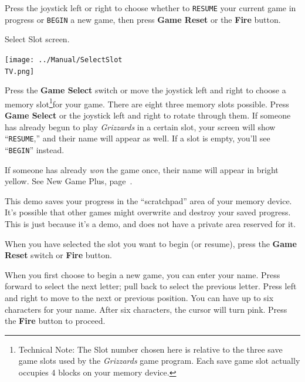 \documentclass[10pt,twocolumn,openany,article]{memoir}
\newcommand\TV{NTSC}
\newcommand\TV{PAL}
\newcommand\TV{SECAM}
\begin{document}
Press the  joystick left or  right to choose whether  to \texttt{RESUME}
your current game  in progress or \texttt{BEGIN} a new  game, then press
\textbf{Game Reset} or the \textbf{Fire} button.

\else
Select Slot screen.

\begin{center}
  \texttt{[image: ../Manual/SelectSlot\\TV.png]}
\end{center}

Press  the \textbf{Game  Select} switch  or move  the joystick  left and
right             to             choose             a             memory
slot\ifdefined\ATARIAGESAVE\else\footnote{Technical   Note:   The   Slot
  number chosen  here is relative to  the three save game  slots used by
  the  \textit{Grizzards} game  program.  Each save  game slot  actually
  occupies 4 blocks on your memory  device.}\fi for your game. There are
\ifdefined\ATARIAGESAVE  eight \else  three \fi  memory slots  possible.
Press  \textbf{Game Select}  or the  joystick left  and right  to rotate
through them. If someone has already begun to play \textit{Grizzards} in
a certain  slot, your  screen will  show ``\texttt{RESUME},''  and their
name  will   appear  as   well.  If   a  slot   is  empty,   you'll  see
``\texttt{BEGIN}'' instead.

If someone has already \emph{won} the  game once, their name will appear
in bright yellow. See New Game Plus, page~\pageref{sec:NewGamePlus}.

\ifdefined\DEMO

\skip

This demo saves your progress in  the ``scratchpad'' area of your memory
device. It's possible that other  games might overwrite and destroy your
saved progress.  This is  just because  it's a demo,  and does  not have
a private area reserved for it.

\skip

\fi

When you have selected the slot you want to begin (or resume), press the
\textbf{Game Reset} switch or \textbf{Fire} button.

\fi

\ifdefined\NOSAVE\else

When you  first choose  to begin a  new game, you  can enter  your name.
Press  forward to  select  the  next letter;  pull  back  to select  the
previous letter.  Press left and right  to move to the  next or previous
position. You  can have up  to six characters  for your name.  After six
characters, the  cursor will turn  pink. Press the  \textbf{Fire} button
to proceed.
\end{document}
